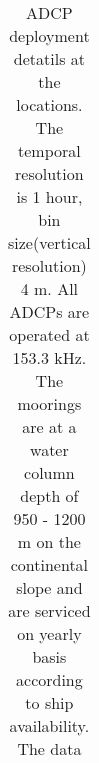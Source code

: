 \newpage
{} 

\begin{table}[htbp]
	
	{\footnotesize
		
		\captionsetup{justification=justified,font=footnotesize,skip=0.05\baselineskip} %
		\caption{\newline
			ADCP deployment detatils at the locations. The temporal resolution is 1 hour, bin size(vertical resolution) 4 m. All ADCPs are operated at 153.3 kHz. The moorings are at a water column depth of 950 - 1200 m on the continental slope and are serviced on yearly basis according to ship availability. The data }
		\begin{adjustwidth}{0in}{0in} 
			\begin{tabular}{ccccccc}
				

\end{tabular}
\end{adjustwidth}}
\end{table}
